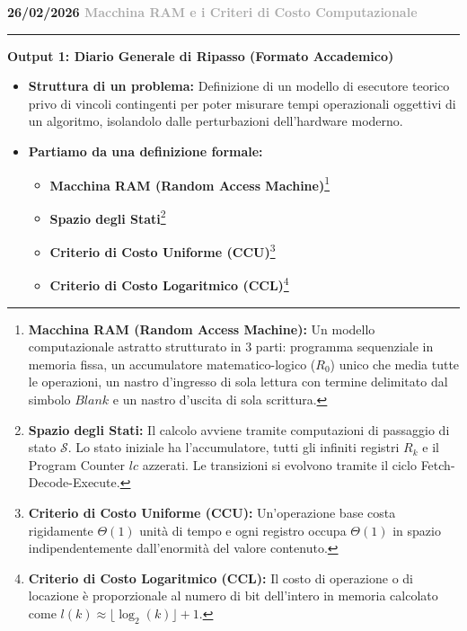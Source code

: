 \documentclass[a4paper, 11pt]{report}
\newcommand{\lezione}[2]{
\vspace{2em}
\noindent\textbf{\Large #1 \hfill \textcolor{darkgray}{#2}}
\vspace{0.5em}
\hrule
\vspace{1.5em}
}
\newcommand{\definizione}[2]{%
\textbf{#1}\footnote{\textbf{#1:} #2}%
}
\begin{document}
\lezione{26/02/2026}{Macchina RAM e i Criteri di Costo Computazionale}
\vspace{0.5cm}
\textbf{Output 1: Diario Generale di Ripasso (Formato Accademico)}
\begin{itemize}
\item \textbf{Struttura di un problema:}
Definizione di un modello di esecutore teorico privo di vincoli contingenti per poter misurare tempi operazionali oggettivi di un algoritmo, isolandolo dalle perturbazioni dell'hardware moderno.

\item \textbf{Partiamo da una definizione formale:}
\begin{itemize}
    \item \definizione{Macchina RAM (Random Access Machine)}{Un modello computazionale astratto strutturato in 3 parti: programma sequenziale in memoria fissa, un accumulatore matematico-logico ($R_0$) unico che media tutte le operazioni, un nastro d'ingresso di sola lettura con termine delimitato dal simbolo $Blank$ e un nastro d'uscita di sola scrittura.}
    \item \definizione{Spazio degli Stati}{Il calcolo avviene tramite computazioni di passaggio di stato $\mathcal{S}$. Lo stato iniziale ha l'accumulatore, tutti gli infiniti registri $R_k$ e il Program Counter $lc$ azzerati. Le transizioni si evolvono tramite il ciclo Fetch-Decode-Execute.}
    \item \definizione{Criterio di Costo Uniforme (CCU)}{Un'operazione base costa rigidamente $\Theta(1)$ unità di tempo e ogni registro occupa $\Theta(1)$ in spazio indipendentemente dall'enormità del valore contenuto.}
    \item \definizione{Criterio di Costo Logaritmico (CCL)}{Il costo di operazione o di locazione è proporzionale al numero di bit dell'intero in memoria calcolato come $l(k) \approx \lfloor \log_2(k) \rfloor + 1$.}
\end{itemize}


\end{itemize}
\end{document}
